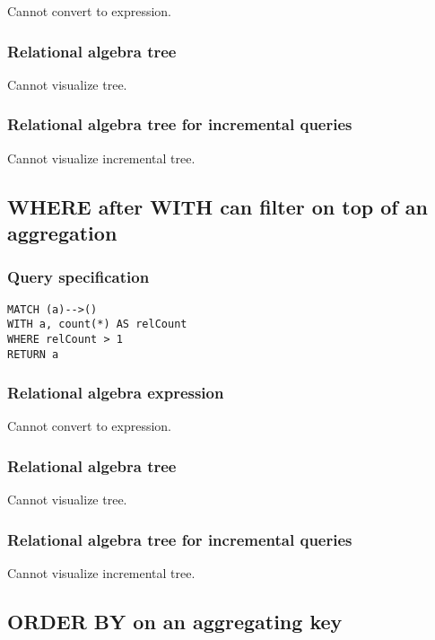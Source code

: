 Cannot convert to expression.

\subsubsection*{Relational algebra tree}

Cannot visualize tree.

\subsubsection*{Relational algebra tree for incremental queries}

Cannot visualize incremental tree.

\subsection{WHERE after WITH can filter on top of an aggregation}

\subsubsection*{Query specification}

\begin{lstlisting}
MATCH (a)-->()
WITH a, count(*) AS relCount
WHERE relCount > 1
RETURN a
\end{lstlisting}

\subsubsection*{Relational algebra expression}

Cannot convert to expression.

\subsubsection*{Relational algebra tree}

Cannot visualize tree.

\subsubsection*{Relational algebra tree for incremental queries}

Cannot visualize incremental tree.

\subsection{ORDER BY on an aggregating key}

